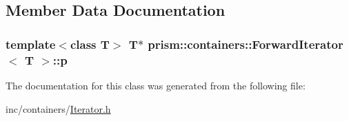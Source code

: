 \subsection{Member Data Documentation}
\subsubsection[{\texorpdfstring{p}{p}}]{\setlength{\rightskip}{0pt plus 5cm}template$<$class T$>$ T$\ast$ {\bf prism\+::containers\+::\+Forward\+Iterator}$<$ T $>$\+::p}\hypertarget{classprism_1_1containers_1_1_forward_iterator_afae3bf32acc98ab535b9bdb8156ba58f}{}\label{classprism_1_1containers_1_1_forward_iterator_afae3bf32acc98ab535b9bdb8156ba58f}


The documentation for this class was generated from the following file\+:\begin{DoxyCompactItemize}
\item 
inc/containers/\hyperlink{_iterator_8h}{Iterator.\+h}\end{DoxyCompactItemize}
